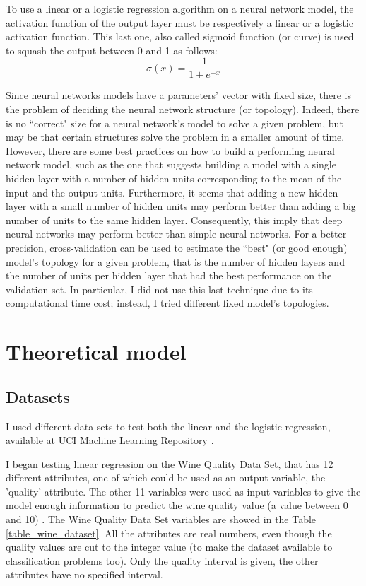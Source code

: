 \documentclass[10pt,journal,A4paper,compsoc,epsfig]{IEEEtran}
\begin{document}
To use a linear or a logistic regression algorithm on a neural network model, the activation function of the output layer must be respectively a linear or a logistic activation function. This last one, also called sigmoid function (or curve) is used to squash the output between 0 and 1 as follows:
\begin{equation}
\sigma(x) = \dfrac{1}{1+e^{-x}}
\end{equation}

Since neural networks models have a parameters' vector with fixed size, there is the problem of deciding the neural network structure (or topology). Indeed, there is no ``correct" size for a neural network's model to solve a given problem, but may be that certain structures solve the problem in a smaller amount of time. However, there are some best practices on how to build a performing neural network model, such as the one that suggests building a model with a single hidden layer with a number of hidden units corresponding to the mean of the input and the output units. Furthermore, it seems that adding a new hidden layer with a small number of hidden units may perform better than adding a big number of units to the same hidden layer. Consequently, this imply that deep neural networks may perform better than simple neural networks.
For a better precision, cross-validation can be used to estimate the ``best" (or good enough) model's topology for a given problem, that is the number of hidden layers and the number of units per hidden layer that had the best performance on the validation set. In particular, I did not use this last technique due to its computational time cost; instead, I tried different fixed model's topologies.


\section{Theoretical model}
 \label{model}
 
\subsection{Datasets}
I used different data sets to test both the linear and the logistic regression, available at UCI Machine Learning Repository \cite{Dua:2017}.

I began testing linear regression on the Wine Quality Data Set, that has  12 different attributes, one of which could be used as an output variable, the 'quality' attribute. The other 11 variables were used as input variables to give the model enough information to predict the wine quality value (a value between 0 and 10) \cite{CORTEZ2009547}. The Wine Quality Data Set variables are showed in the Table \ref{table_wine_dataset}. All the attributes are real numbers, even though the quality values are cut to the integer value (to make the dataset available to classification problems too). Only the quality interval is given, the other attributes have no specified interval.
\end{document}
